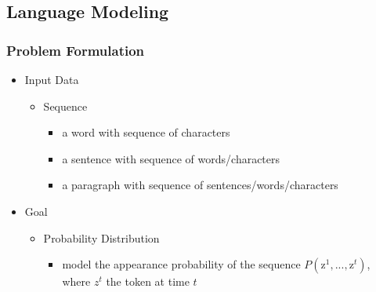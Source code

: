 \subsection{Language Modeling}
\subsubsection{Problem Formulation}
\begin{itemize}
\item Input Data
	\begin{itemize}
	\item Sequence
		\begin{itemize}
		\item a word with sequence of characters
		\item a sentence with sequence of words/characters
		\item a paragraph with sequence of sentences/words/characters
		\end{itemize}
	\end{itemize}
\item Goal
	\begin{itemize}
	\item Probability Distribution
		\begin{itemize}
		\item model the appearance probability of the sequence $P(\text{z}^1,...,\text{z}^{t})$, \\
		where $z^t$ the token at time $t$
		\end{itemize}
	\end{itemize}
\end{itemize}

